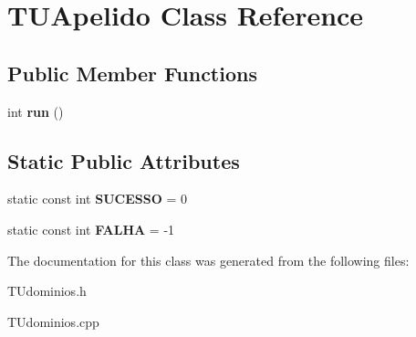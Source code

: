 \hypertarget{classTUApelido}{}\section{T\+U\+Apelido Class Reference}
\label{classTUApelido}
\subsection*{Public Member Functions}
\begin{DoxyCompactItemize}
\item 
\mbox{\label{classTUApelido_ab5aabaa60fd00030d047ef8bf6c55fec}} 
int {\bfseries run} ()
\end{DoxyCompactItemize}
\subsection*{Static Public Attributes}
\begin{DoxyCompactItemize}
\item 
\mbox{\label{classTUApelido_aa100f19a4867e7bf07c49161bb2efef0}} 
static const int {\bfseries S\+U\+C\+E\+S\+SO} = 0
\item 
\mbox{\label{classTUApelido_afdc614cde9b44f65a445dbaf41142698}} 
static const int {\bfseries F\+A\+L\+HA} = -\/1
\end{DoxyCompactItemize}


The documentation for this class was generated from the following files\+:\begin{DoxyCompactItemize}
\item 
T\+Udominios.\+h\item 
T\+Udominios.\+cpp\end{DoxyCompactItemize}
